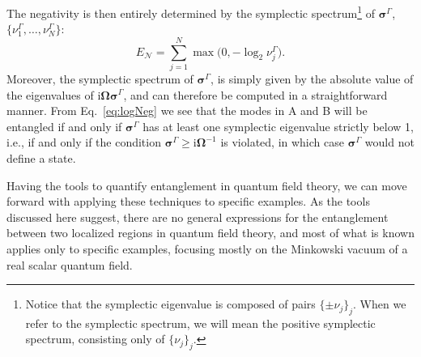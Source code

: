 \documentclass[letterpaper,12pt,titlepage,oneside,final]{book}
\newcommand{\ii}{\mathrm{i}}
\newcommand{\tc}[1]{\textsc{#1}}
\begin{document}
The negativity is then entirely determined by the symplectic spectrum\footnote{Notice that the symplectic eigenvalue is composed of pairs $\{\pm \nu_j\}_j$. When we refer to the symplectic spectrum, we will mean the positive symplectic spectrum, consisting only of $\{\nu_j\}_j$.} of ${\bm\sigma}^\Gamma$, $\{{\nu}_1^\Gamma,\hdots,{\nu}_{N}^\Gamma\}$:
\begin{equation}
    E_{\mathcal{N}} = \sum_{j=1}^{N} \max\big(0,-\log_2\nu_j^\Gamma\big).\label{eq:logNeg}
\end{equation}
Moreover, the symplectic spectrum of ${\bm\sigma}^\Gamma$, is simply given by the absolute value of the eigenvalues of $\ii \bm \Omega \bm \sigma^\Gamma$, and can therefore be computed in a straightforward manner. From Eq.~\eqref{eq:logNeg} we see that the modes in A and B will be entangled if and only if $\bm{\sigma}^\Gamma$ has at least one symplectic eigenvalue strictly below 1, i.e., if and only if the condition $\bm\sigma^\Gamma \geq \ii \bm\Omega^{-1}$ is violated, in which case $\bm \sigma^\Gamma$ would not define a state.


Having the tools to quantify entanglement in quantum field theory, we can move forward with applying these techniques to specific examples. As the tools discussed here suggest, there are no general expressions for the entanglement between two localized regions in quantum field theory, and most of what is known applies only to specific examples, focusing mostly on the Minkowski vacuum of a real scalar quantum field. %



\end{document}
